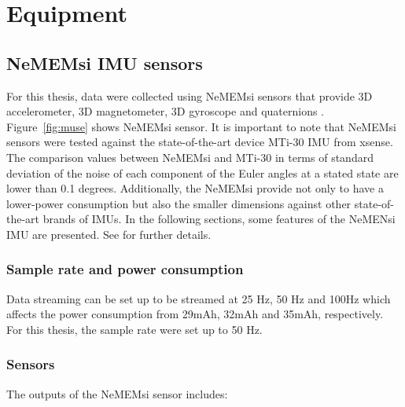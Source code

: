 		\chapter{Equipment} \label{appendix:c}


\graphicspath{{figs/appendixC/PDF/}}


\section{NeMEMsi IMU sensors}  \label{appendix:imus}
For this thesis, data were collected using NeMEMsi sensors 
that provide 3D accelerometer, 3D magnetometer, 
3D gyroscope and quaternions \citep{Comotti2014}.
Figure~\ref{fig:muse} shows NeMEMsi sensor.
It is important to note that NeMEMsi sensors 
were tested against the state-of-the-art device MTi-30 IMU from xsense.
The comparison values between NeMEMsi and MTi-30 in terms of standard deviation 
of the noise of each component of the Euler angles at a stated state are lower 
than 0.1 degrees. 
Additionally, the NeMEMsi provide not only to have a lower-power consumption 
but also the smaller dimensions against other state-of-the-art brands of IMUs.
In the following sections, some features of the NeMENsi IMU are presented.
See \cite{Comotti2014} for further details.


\subsection*{Sample rate and power consumption}
Data streaming can be set up to be streamed at 25 Hz, 50 Hz and 100Hz which
affects the power consumption from 29mAh, 32mAh and 35mAh, respectively.
For this thesis, the sample rate were set up to 50 Hz.

\subsection*{Sensors}
The outputs of the NeMEMsi sensor includes:

